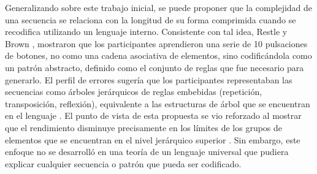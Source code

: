 
Generalizando sobre este trabajo inicial, se puede proponer que la complejidad de una secuencia se relaciona con la longitud de su forma comprimida cuando se recodifica utilizando un lenguaje interno. Consistente con tal idea, Restle y Brown \cite{f36}, mostraron que los participantes aprendieron una serie de 10 pulsaciones de botones, no como una cadena asociativa de elementos, sino codificándola como un patrón abstracto, definido como el conjunto de reglas que fue necesario para generarlo. El perfil de errores sugería que los participantes representaban las secuencias como árboles jerárquicos de reglas embebidas (repetición, transposición, reflexión), equivalente a las estructuras de árbol que se encuentran en el lenguaje \cite{f37}. El punto de vista de esta propuesta se vio reforzado al mostrar que el rendimiento disminuye precisamente en los límites de los grupos de elementos que se encuentran en el nivel jerárquico superior \cite{f36,f37,f38}. Sin embargo, este enfoque no se desarrolló en una teoría de un lenguaje universal que pudiera explicar cualquier secuencia o patrón que pueda ser codificado.

